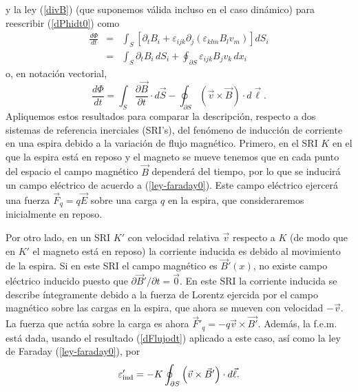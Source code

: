 y la ley (\ref{divB}) (que suponemos válida incluso en el caso dinámico) para reescribir (\ref{dPhidt0}) como
\begin{eqnarray}
 \frac{d\Phi}{dt}&=&\int_S\left[\partial_tB_i+\varepsilon_{ijk}
\partial_j(\varepsilon_{klm} B_lv_m)\right] dS_i \\
&=& \int_S\partial_tB_i\, dS_i +\oint_{\partial S}\varepsilon_{ijk}
B_jv_k\,dx_i 
\end{eqnarray}
o, en notación vectorial, 
\begin{equation}\label{dFlujodt}
  \frac{d\Phi}{dt}=\int_S\frac{\partial\vec{B}}{\partial
t}\cdot d\vec{S}-\oint_{\partial
S}\left(\vec{v}\times\vec{B}\right)\cdot d\vec{\ell}.
\end{equation}
Apliquemos estos resultados para comparar la descripción, respecto a dos sistemas de referencia inerciales (SRI's), del fenómeno de inducción de corriente en una espira debido a la variación de flujo magnético. Primero, en el SRI $K$ en el que la espira está en reposo y el magneto se mueve tenemos que en cada punto del espacio el campo magnético $\vec{B}$ dependerá del tiempo, por lo que se inducirá un campo eléctrico de acuerdo a (\ref{ley-faraday0}). Este campo eléctrico ejercerá una fuerza $\vec{F}_q=q\vec{E}$ sobre una carga $q$ en la espira, que consideraremos inicialmente en reposo. 

Por otro lado, en un SRI $K'$ con velocidad relativa $\vec{v}$ respecto a $K$ (de modo que en $K'$ el magneto está en reposo) la corriente inducida es debido al movimiento de la espira. Si en este SRI el campo magnético es $\vec{B}'(x)$, no existe campo eléctrico inducido puesto que $\partial\vec{B}'/\partial t=\vec{0}$. En este SRI la corriente inducida se describe íntegramente debido a la fuerza de Lorentz ejercida por el campo magnético sobre las cargas en la espira, que ahora se mueven con velocidad $-\vec{v}$. La fuerza que actúa sobre la carga es ahora $\vec{F}'_q=-q\vec{v}\times\vec{B'}$. Además, la f.e.m. está dada, usando el resultado (\ref{dFlujodt}) aplicado a este caso, así como la ley de Faraday (\ref{ley-faraday0}), por 
\begin{equation}
\varepsilon'_{\rm ind}=-K\oint_{\partial S}\left(\vec{v}\times\vec{B}'\right)\cdot d\vec{\ell}.
\end{equation}

